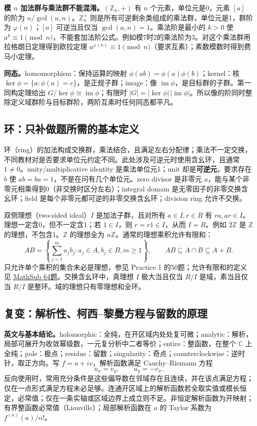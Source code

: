 \documentclass[11pt,a4paper,fontset=fandol]{ctexart}
\begin{document}
\textbf{模 $n$ 加法群与乘法群不能混淆。}$(\mathbb Z_n,+)$ 有 $n$ 个元素，单位元是0，元素 $[a]$ 的阶为 $n/\gcd(a,n)$。$\mathbb Z_n^\times$ 则是所有可逆剩余类组成的乘法群，单位元是1，群阶为 $\varphi(n)$；$[a]$ 可逆当且仅当 $\gcd(a,n)=1$。乘法阶是最小的 $k>0$ 使 $a^k\equiv1\pmod n$，不能套加法阶公式。例如模7时2的乘法阶为3。对这个乘法群用拉格朗日定理得到欧拉定理 $a^{\varphi(n)}\equiv1\pmod n$（要求互素）；素数模数时得到费马小定理。

\textbf{同态。}homomorphism：保持运算的映射 $\phi(ab)=\phi(a)\phi(b)$；kernel：核 $\ker\phi=\{a:\phi(a)=e\}$，是正规子群；image：像 $\operatorname{im}\phi$，是目标群的子群。第一同构定理给出 $G/\ker\phi\cong\operatorname{im}\phi$；有限时 $|G|=|\ker\phi|\,|\operatorname{im}\phi|$。所以像的阶同时整除定义域群阶与目标群阶，两阶互素时任何同态都平凡。

\subsection{环：只补做题所需的基本定义}
\label{review:rings}
环（ring）的加法构成交换群，乘法结合，且满足左右分配律；乘法不一定交换，不同教材对是否要求单位元约定不同。此处涉及可逆元时使用含幺环，且通常 $1\ne0$。unity/multiplicative identity 是乘法单位元1；unit 却是\textbf{可逆元}，要求存在 $b$ 使 $ab=ba=1$，不是在问有几个单位元。zero divisor 是非零元 $a$，能与某个非零元相乘得到0（非交换时区分左右）；integral domain 是无零因子的非零交换含幺环；field 是每个非零元都可逆的非零交换含幺环；division ring 允许不交换。

双侧理想（two-sided ideal）$I$ 是加法子群，且对所有 $a\in I,r\in R$ 有 $ra,ar\in I$。理想一定含0，但不一定含1；若 $1\in I$，则 $r=r1\in I$，从而 $I=R$。例如 $2\mathbb Z$ 是 $\mathbb Z$ 的理想，不包含1。$\mathbb Z$ 的理想全为 $n\mathbb Z$。通常的理想乘积允许有限和：
\[
AB=\left\{\sum_{j=1}^m a_jb_j:a_j\in A,b_j\in B,m\ge1\right\},\qquad
AB\subseteq A\cap B\subseteq A+B.
\]
只允许单个乘积的集合未必是理想，参见 Practice 1 的50题；允许有限和的定义见 \hyperref[ms:q64]{MathSub 64题}。交换含幺环中，真理想 $I$ 极大当且仅当 $R/I$ 是域，素当且仅当 $R/I$ 是整环。域的理想只有零理想和全环。

\subsection{复变：解析性、柯西--黎曼方程与留数的原理}
\label{review:residues}
\textbf{英文与基本结论。}holomorphic：全纯，在开区域内处处复可微；analytic：解析，局部可展开为收敛幂级数，一元复分析中二者等价；entire：整函数，在整个 $\mathbb C$ 上全纯；pole：极点；residue：留数；singularity：奇点；counterclockwise：逆时针，取正方向。写 $f=u+iv$，解析函数满足 Cauchy--Riemann 方程
\begin{equation}
u_x=v_y,\qquad u_y=-v_x.
\label{review:cr}
\end{equation}
反向使用时，常用充分条件是这些偏导数在邻域存在且连续，并在该点满足方程；仅在一点形式满足方程未必足够。连通开区域上的解析函数若全取实值或模长恒定，必常值；仅在一条实轴或区域边界上成立则不足。非恒定解析函数为开映射；有界整函数必常值（Liouville）；局部解析函数在 $a$ 的 Taylor 系数为 $f^{(n)}(a)/n!$。
\end{document}
